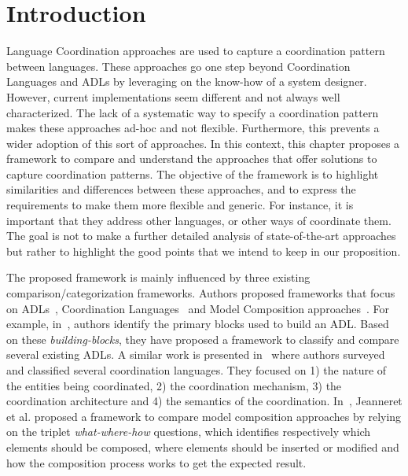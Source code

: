 \section{Introduction}
Language Coordination approaches are used to capture a coordination pattern between languages. These approaches go one step beyond Coordination Languages and ADLs by leveraging on the know-how of a system designer. However, current implementations seem different and not always well characterized. The lack of a systematic way to specify a coordination pattern makes these approaches ad-hoc and not flexible. Furthermore, this prevents a wider adoption of this sort of approaches. In this context, this chapter proposes a framework to compare and understand the approaches that offer solutions to capture coordination patterns. The objective of the framework is to highlight similarities and differences between these approaches, and to express the requirements to make them more flexible and generic. For instance, it is important that they address other languages, or other ways of coordinate them. The goal is not to make a further detailed analysis of state-of-the-art approaches but rather to highlight the good points that we intend to keep in our proposition. 

The proposed framework is mainly influenced by three existing comparison/categorization frameworks. Authors proposed frameworks that focus on ADLs~\cite{frameadlsbib}, Coordination Languages~\cite{coordmodels} and Model Composition approaches~\cite{framecompoas}. For example, in~\cite{frameadlsbib}, authors identify the primary blocks used to build an ADL. Based on these \emph{building-blocks}, they have proposed a framework to classify and compare several existing ADLs. A similar work is presented in~\cite{coordmodels} where authors surveyed and classified several coordination languages. They focused on 1) the nature of the entities being coordinated, 2) the coordination mechanism, 3) the coordination architecture and 4) the semantics of the coordination. In~\cite{framecompoas}, Jeanneret et al. proposed a framework to compare model composition approaches by relying on the triplet \emph{what-where-how} questions, which identifies respectively which elements should be composed, where elements should be inserted or modified and how the composition process works to get the expected result. 

